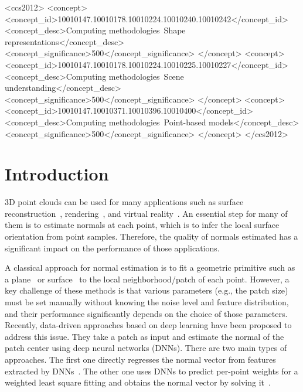\documentclass[sigconf]{acmart}
\begin{document}
\begin{CCSXML}
<ccs2012>
   <concept>
       <concept_id>10010147.10010178.10010224.10010240.10010242</concept_id>
       <concept_desc>Computing methodologies~Shape representations</concept_desc>
       <concept_significance>500</concept_significance>
       </concept>
   <concept>
       <concept_id>10010147.10010178.10010224.10010225.10010227</concept_id>
       <concept_desc>Computing methodologies~Scene understanding</concept_desc>
       <concept_significance>500</concept_significance>
       </concept>
   <concept>
       <concept_id>10010147.10010371.10010396.10010400</concept_id>
       <concept_desc>Computing methodologies~Point-based models</concept_desc>
       <concept_significance>500</concept_significance>
       </concept>
 </ccs2012>
\end{CCSXML}









\maketitle

\section{Introduction}
3D point clouds can be used for many applications such as surface reconstruction~\cite{kazhdan2006poisson}, rendering~\cite{gouraud1971continuous}, and virtual reality~\cite{garrido2021point}. An essential step for many of them is to estimate normals at each point, which is to infer the local surface orientation from point samples. Therefore, the quality of normals estimated has a significant impact on the performance of those applications.

A classical approach for normal estimation is to fit a geometric primitive such as a plane~\cite{hoppe1992surface} or surface~\cite{cazals2005estimating} to the local neighborhood/patch of each point. 
However, a key challenge of these methods is that various parameters (e.g., the patch size) must be set manually without knowing the noise level and feature distribution, and their performance significantly depends on the choice of those parameters. 
Recently, data-driven approaches based on deep learning have been proposed to address this issue. They take a patch as input and estimate the normal of the patch center using deep neural networks (DNNs). There are two main types of approaches. The first one directly regresses the normal vector from features extracted by DNNs~\cite{guerrero2018pcpnet}. The other one uses DNNs to predict per-point weights for a weighted least square fitting and obtains the normal vector by solving it~\cite{lenssen2020deep}.
\end{document}
